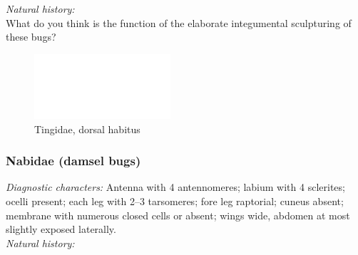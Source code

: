 \documentclass[letterpaper, 11pt]{article}
\begin{document}
\noindent{}\textit{Natural history:} \\

\noindent{}What do you think is the function of the elaborate integumental sculpturing of these bugs?\vspace{3cm}

\begin{figure}[ht!]
 \centering
 \includegraphics[width=0.45\textwidth]{image14}
 \caption{Tingidae, dorsal habitus}
 \label{fig:tingid1}
\end{figure}

\subsubsection{Nabidae (damsel bugs)}
\noindent{}\textit{Diagnostic characters:} Antenna with 4 antennomeres; labium with 4 sclerites; ocelli present; each leg with 2--3 tarsomeres; fore leg raptorial; cuneus absent; membrane with numerous closed cells or absent; wings wide, abdomen at most slightly exposed laterally.\\

\noindent{}\textit{Natural history:} \\
\end{document}

